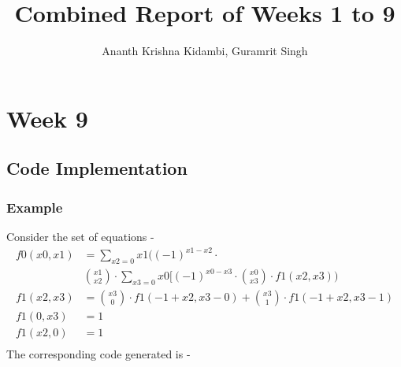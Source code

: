 \documentclass[12pt]{report}
\title{Combined Report of Weeks 1 to 9}
\author{Ananth Krishna Kidambi, Guramrit Singh}
\begin{document}
    \maketitle
    \tableofcontents
    \chapter*{Week 9}
    \section*{Code Implementation}
    \subsection*{Example}
    Consider the set of equations - 
    \begin{align*}
        f0(x0,x1)&=\sum_{x2=0}{x1}((-1)^{x1-x2}\cdot\\ & \binom{x1}{x2}\cdot \sum_{x3=0}{x0}[(-1)^{x0-x3}\cdot \binom{x0}{x3}\cdot f1(x2,x3))\\
        f1(x2,x3)&=\binom{x3}{0}\cdot f1(-1+x2,x3-0)+\binom{x3}{1}\cdot f1(-1+x2,x3-1)\\
        f1(0,x3)&=1\\
        f1(x2,0)&=1\\
    \end{align*}
    The corresponding code generated is - 
\end{document}
